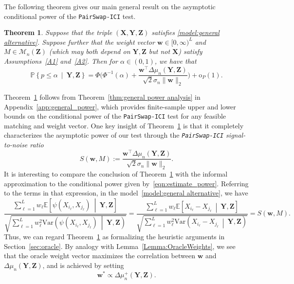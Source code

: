 \documentclass[12pt]{article}
\newtheorem{theorem}{Theorem}%
\newcommand{\EEst}[2]{\mathbb{E}\left[{#1}\  \middle| \ {#2}\right]}
\newcommand{\VVst}[2]{\mathrm{Var}\left({#1}\  \middle| \ {#2}\right)}
\newcommand{\PPst}[2]{\mathbb{P}\left\{{#1}\  \middle| \ {#2}\right\}}
\newcommand{\bX}{\mathbf{X}}
\newcommand{\bY}{\mathbf{Y}}
\newcommand{\bZ}{\mathbf{Z}}
\newcommand{\bw}{\mathbf{w}}
\begin{document}
The following theorem gives our main general result on the asymptotic conditional power of the \texttt{PairSwap-ICI} test.

\begin{theorem}\label{thm:general-power-asymptotic}
    Suppose that the triple $(\bX,\bY,\bZ)$ satisfies \eqref{model:general alternative}.  Suppose further that the weight vector $\bw \in [0,\infty)^L$ and $M \in \mathcal{M}_n(\bZ)$ (which may both depend on $\bY,\bZ$ but not $\bX$) satisfy Assumptions~\ref{A1} and~\ref{A2}.  Then for $\alpha \in (0,1)$, we have that
    \[
    \PPst{p\leq \alpha}{\bY,\bZ}=\Phi\biggl(\Phi^{-1}(\alpha)+\frac{\bw^\top \Delta \mu_n(\bY,\bZ)}{\sqrt{2}\sigma_n\|\bw\|_2}\biggr)+\mathrm{o}_P(1).
    \]
\end{theorem}
Theorem~\ref{thm:general-power-asymptotic} follows from Theorem~\ref{thm:general power analysis} in Appendix~\ref{app:general_power}, which provides finite-sample upper and lower bounds on the conditional power of the \texttt{PairSwap-ICI} test for any feasible matching and weight vector.  One key insight of Theorem~\ref{thm:general-power-asymptotic} is that it completely characterizes the asymptotic power of our test through the \emph{\texttt{PairSwap-ICI} signal-to-noise ratio}
\begin{equation}\label{eqn:signal_general_wandM}
    S(\bw,M):=\frac{\bw^\top \Delta \mu_n(\bY,\bZ)}{\sqrt{2}\sigma_n\|\bw\|_2}.
\end{equation}
It is interesting to compare the conclusion of Theorem~\ref{thm:general-power-asymptotic} with the informal approximation to the conditional power given by~\eqref{eqn:estimate_power}.  Referring to the terms in that expression, in the model~\eqref{model:general alternative}, we have
\[
\frac{\sum_{\ell=1}^L w_\ell \EEst{\psi(X_{i_\ell},X_{j_\ell})}{\bY,\bZ}}{\sqrt{\sum_{\ell=1}^L w_\ell^2 \VVst{\psi(X_{i_\ell},X_{j_\ell})}{\bY,\bZ}}}
= \frac{\sum_{\ell=1}^L w_\ell \EEst{X_{i_\ell} - X_{j_\ell}}{\bY,\bZ}}{\sqrt{\sum_{\ell=1}^L w_\ell^2 \VVst{X_{i_\ell} - X_{j_\ell}}{\bY,\bZ}}} =  S(\bw,M).
\]
Thus, we can regard Theorem~\ref{thm:general-power-asymptotic} as formalizing the heuristic arguments in Section~\ref{sec:oracle}.  By analogy with Lemma~\ref{Lemma:OracleWeights}, we see that the oracle weight vector maximizes the correlation between $\bw$ and $\Delta \mu_n(\bY,\bZ)$, and is achieved by setting
\begin{equation}\label{eqn:oracle_weight_general_model}
    \bw^* \propto \Delta \mu_n^+(\bY,\bZ).
\end{equation}
\end{document}
